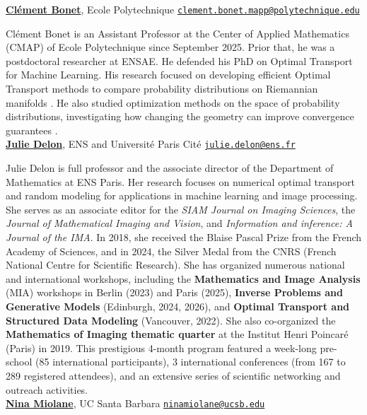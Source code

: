 \documentclass{article}
\begin{document}
\href{https://clbonet.github.io/}{\textbf{Cl\'ement Bonet}}, Ecole Polytechnique \hfill \href{mailto:clement.bonet.mapp@polytechnique.edu}{\texttt{clement.bonet.mapp@polytechnique.edu}}

Clément Bonet is an Assistant Professor at the Center of Applied Mathematics (CMAP) of Ecole Polytechnique since September 2025. Prior that, he was a postdoctoral researcher at ENSAE. He defended his PhD on Optimal Transport for Machine Learning. His research focused on developing efficient Optimal Transport methods to compare probability distributions on Riemannian manifolds \citep{bonet2022spherical, bonet2023sliced, bonet2023hyperbolic, bonet2024sliced}. He also studied optimization methods on the space of probability distributions, investigating how changing the geometry can improve convergence guarantees \citep{bonet2024mirror}. \\

\href{https://judelo.github.io/}{\textbf{Julie Delon}}, ENS and Université Paris Cité \hfill \href{mailto:julie.delon@ens.fr}{\texttt{julie.delon@ens.fr}}

Julie Delon is full professor and the associate director of the Department of Mathematics at ENS Paris. Her research focuses on numerical optimal transport and random modeling for applications in machine learning and image processing. She serves as an associate editor for the \textit{SIAM Journal on Imaging Sciences}, the \textit{Journal of Mathematical Imaging and Vision}, and \textit{Information and inference: A Journal of the IMA}. In 2018, she received the Blaise Pascal Prize from the French Academy of Sciences, and in 2024, the Silver Medal from the CNRS (French National Centre for Scientific Research). She has organized numerous national and international workshops, including the \textbf{Mathematics and Image Analysis} (MIA) workshops in Berlin (2023) and Paris (2025), \textbf{Inverse Problems and Generative Models} (Edinburgh, 2024, 2026), and \textbf{Optimal Transport and Structured Data Modeling} (Vancouver, 2022). She also co-organized the \textbf{Mathematics of Imaging thematic quarter} at the Institut Henri Poincaré (Paris) in 2019. This prestigious 4-month program featured a week-long pre-school (85 international participants), 3 international conferences (from 167 to 289 registered attendees), and an extensive series of scientific networking and outreach activities. \\

\href{https://www.ninamiolane.com/}{\textbf{Nina Miolane}}, UC Santa Barbara \hfill \href{mailto:ninamiolane at ucsb.edu}{\texttt{ninamiolane@ucsb.edu}} 
\end{document}
